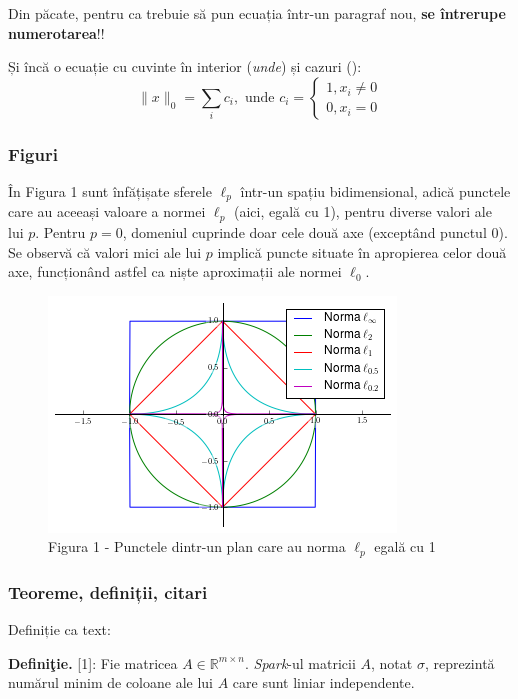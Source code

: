 \documentclass[]{article}
\begin{document}
Din păcate, pentru ca trebuie să pun ecuația într-un paragraf nou,
\textbf{se întrerupe numerotarea}!!

Și încă o ecuație cu cuvinte în interior (\emph{unde}) și cazuri (): \[
 \|x\|_0 = \sum_{i}^{} c_i, \textrm{ unde } c_i = \begin{cases} 1 , x_i \neq 0 \\ 0 , x_i = 0 \end{cases} 
\]

\subsubsection{Figuri}\label{figuri}

În Figura 1 sunt înfățișate sferele \(\ell_p\) într-un spațiu
bidimensional, adică punctele care au aceeași valoare a normei
\(\ell_p\) (aici, egală cu 1), pentru diverse valori ale lui \(p\).
Pentru \(p = 0\), domeniul cuprinde doar cele două axe (exceptând
punctul 0). Se observă că valori mici ale lui \(p\) implică puncte
situate în apropierea celor două axe, funcționând astfel ca niște
aproximații ale normei \(\ell_0\).

\begin{figure}[htbp]
\centering
\includegraphics{lpnorms.png}
\caption{Figura 1 - Punctele dintr-un plan care au norma \(\ell_p\)
egală cu 1}
\end{figure}

\subsubsection{Teoreme, definiții,
citari}\label{teoreme-definiux21bii-citari}

Definiție ca text:

\textbf{Definiţie.} {[}1{]}: Fie matricea
\(A \in \mathbb{R}^{m \times n}\). \emph{Spark}-ul matricii \(A\), notat
\(\sigma\), reprezintă numărul minim de coloane ale lui \(A\) care sunt
liniar independente.
\end{document}
